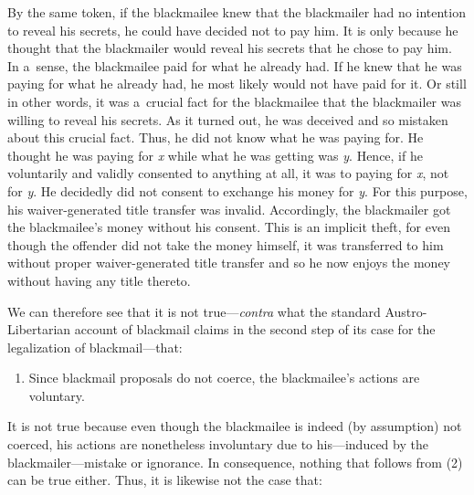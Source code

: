 {By the same token, if the blackmailee knew that the blackmailer had no intention to reveal his secrets, he could have decided not to pay him. It is only because he thought that the blackmailer would reveal his secrets that he chose to pay him. In a~sense, the blackmailee paid for what he already had. If he knew that he was paying for what he already had, he most likely would not have paid for it. Or still in other words, it was a~crucial fact for the blackmailee that the blackmailer was willing to reveal his secrets. As it turned out, he was deceived and so mistaken about this crucial fact. Thus, he did not know what he was paying for. He thought he was paying for \textit{x} while what he was getting was \textit{y}. Hence, if he voluntarily and validly consented to anything at all, it was to paying for \textit{x}, not for \textit{y}. He decidedly did not consent to exchange his money for \textit{y}. For this purpose, his waiver-generated title transfer was invalid. Accordingly, the blackmailer got the blackmailee's money without his consent. This is an implicit theft, for even though the offender did not take the money himself, it was transferred to him without proper waiver-generated title transfer and so he now enjoys the money without having any title thereto.



We can therefore see that it is not true---\textit{contra} what the standard Austro-Libertarian account of blackmail claims in the second step of its case for the legalization of blackmail---that:



\begin{enumerate}

\item Since blackmail proposals do not coerce, the blackmailee's actions are voluntary.

\end{enumerate}

It is not true because even though the blackmailee is indeed (by assumption) not coerced, his actions are nonetheless involuntary due to his---induced by the blackmailer---mistake or ignorance. In consequence, nothing that follows from (2) can be true either. Thus, it is likewise not the case that:



\setcounter{saveenum}{\value{enumi}}

\begin{enumerate}

\setcounter{enumi}{\value{saveenum}}


\end{enumerate}}
